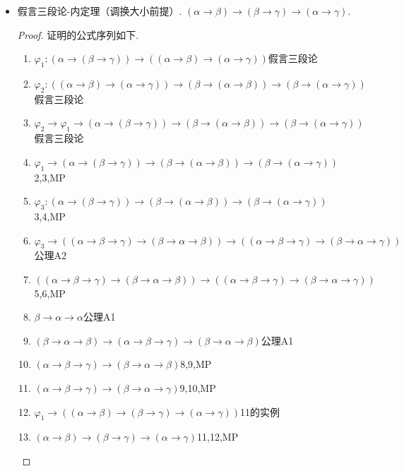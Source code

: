 \begin{itemize}
    \item 假言三段论-内定理（调换大小前提）. \((\alpha \to \beta) \to (\beta \to \gamma) \to (\alpha \to \gamma)\).
    \begin{proof}
        证明的公式序列如下.
        \begin{enumerate}
            \item \(\varphi_1: (\alpha \to (\beta \to \gamma)) \to ((\alpha \to \beta) \to (\alpha \to \gamma))\)\hfill 假言三段论 
            \item \(\varphi_2: ((\alpha \to \beta) \to (\alpha \to \gamma)) \to (\beta \to (\alpha \to \beta)) \to (\beta \to (\alpha \to \gamma))\)\hfill 假言三段论 
            \item \(\varphi_2 \to \varphi_1 \to (\alpha \to (\beta \to \gamma)) \to (\beta \to (\alpha \to \beta)) \to (\beta \to (\alpha \to \gamma))\)\hfill 假言三段论 
            \item \(\varphi_1 \to (\alpha \to (\beta \to \gamma)) \to (\beta \to (\alpha \to \beta)) \to (\beta \to (\alpha \to \gamma))\)\hfill 2,3,MP  
            \item \(\varphi_3: (\alpha \to (\beta \to \gamma)) \to (\beta \to (\alpha \to \beta)) \to (\beta \to (\alpha \to \gamma))\)\hfill 3,4,MP 
            \item \(\varphi_3 \to ((\alpha \to \beta \to \gamma) \to (\beta \to \alpha \to \beta)) \to ((\alpha \to \beta \to \gamma) \to (\beta \to \alpha \to \gamma))\)\hfill 公理A2 
            \item \(((\alpha \to \beta \to \gamma) \to (\beta \to \alpha \to \beta)) \to ((\alpha \to \beta \to \gamma) \to (\beta \to \alpha \to \gamma))\)\hfill 5,6,MP 
            \item \(\beta \to \alpha \to \alpha\)\hfill 公理A1 
            \item \((\beta \to \alpha \to \beta) \to (\alpha \to \beta \to \gamma) \to (\beta \to \alpha \to \beta)\)\hfill 公理A1 
            \item \((\alpha \to \beta \to \gamma) \to (\beta \to \alpha \to \beta)\)\hfill 8,9,MP 
            \item \((\alpha \to \beta \to \gamma) \to (\beta \to \alpha \to \gamma)\)\hfill 9,10,MP 
            \item \(\varphi_1 \to ((\alpha \to \beta) \to (\beta \to \gamma) \to (\alpha \to \gamma))\)\hfill 11的实例
            \item \((\alpha \to \beta) \to (\beta \to \gamma) \to (\alpha \to \gamma)\)\hfill 11,12,MP 
        \end{enumerate}
    \end{proof}


\end{itemize}
